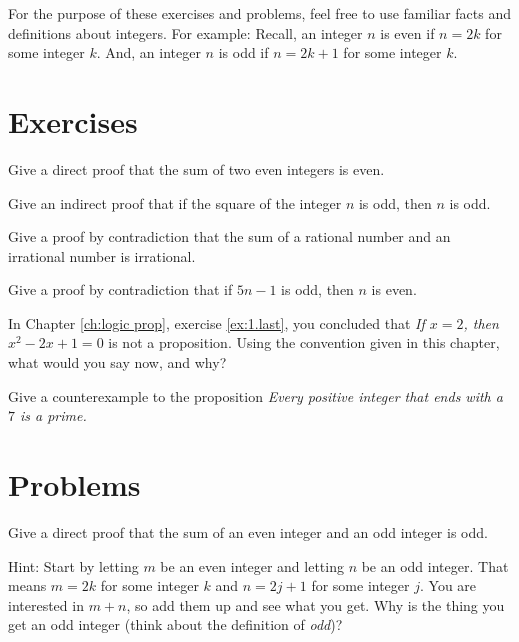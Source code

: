 \clearpage



For the purpose of these exercises and problems, feel free to use familiar facts and definitions  about integers.
For example: Recall, an integer $n$ is even if $n=2k$ for some integer $k$. And, an integer $n$ is odd
if $n=2k+1$ for some integer $k$.

\section{Exercises}

\begin{exer}
Give a direct proof that the sum  of two even integers is even. 
\end{exer}

\begin{exer}
Give an indirect proof that if the square of the integer $n$ is odd, then $n$ is odd.

\end{exer}

\begin{exer}
Give a proof by contradiction that the sum of a rational number and an irrational number is irrational. 
\end{exer}

\begin{exer}
Give a proof by contradiction that if $5n-1$ is odd, then $n$ is even.
\end{exer}



\begin{exer}
In Chapter \ref{ch:logic prop}, exercise \ref{ex:1.last}, you concluded that
{\itshape  If $x=2$, then $x^2-2x+1=0$} is not a proposition.
Using the convention given in this chapter, what would you say now, and
why?

\end{exer}

\begin{exer}
Give a counterexample to the proposition {\itshape Every positive
integer that ends with a $7$ is a prime.}

\end{exer}

\clearpage
\section{Problems}

\begin{prob}
Give a direct proof that the sum of  an even integer and an odd integer is odd. 

Hint: Start by letting $m$ be an even integer and letting $n$ be an odd integer. That means $m = 2k$ for some integer $k$ and $n = 2j+1$ for some integer $j$. You are interested in $m+ n$, so add them up and see what you get.  Why is the thing you get an odd integer (think about the definition of {\it odd})?
\end{prob}

